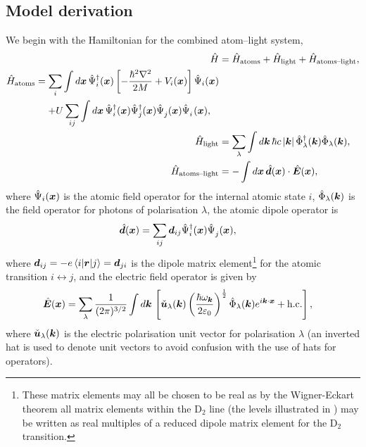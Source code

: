 \subsection{Model derivation}
\label{OpticalPumping:MultimodeModelDerivation}

We begin with the Hamiltonian for the combined atom--light system,
\begin{subequations}
    \label{OpticalPumping:AtomLightHamiltonian}
    \begin{align}
        \hat{H} &= \hat{H}_\text{atoms} + \hat{H}_\text{light} + \hat{H}_\text{atoms--light}, \\
        \begin{split}
            \hat{H}_\text{atoms} &= \sum_i \int d \vect{x}\, \hat{\Psi}_i^\dagger(\vect{x}) \left[ - \frac{\hbar^2 \nabla^2}{2 M} + V_i(\vect{x}) \right] \hat{\Psi}_i(\vect{x}) \\
            &\relphantom{=} + U \sum_{ij}\int d \vect{x}\, \hat{\Psi}_i^\dagger(\vect{x}) \hat{\Psi}_j^\dagger(\vect{x}) \hat{\Psi}_j^{\phantom{\dagger}}(\vect{x}) \hat{\Psi}_i^{\phantom{\dagger}}(\vect{x}),
        \end{split}\\
        \hat{H}_\text{light} &= \sum_\lambda \int d \vect{k}\, \hbar c \abs{\vect{k}} \hat{\Phi}_\lambda^\dagger(\vect{k}) \hat{\Phi}_\lambda(\vect{k}), \\
        \hat{H}_\text{atoms--light} &= - \int d \vect{x}\, \hat{\vect{d}}(\vect{x}) \cdot \hat{\vect{E}}(\vect{x}), \label{OpticalPumping:AtomLightCouplingHamiltonian}
    \end{align}
\end{subequations}
where $\hat{\Psi}_i(\bm{x})$ is the atomic field operator for the internal atomic state $i$, $\hat{\Phi}_\lambda(\bm{k})$ is the field operator for photons of polarisation $\lambda$, the atomic dipole operator is
\begin{align}
    \hat{\bm{d}}(\bm{x}) &= \sum_{ij}\bm{d}_{ij} \hat{\Psi}_i^\dagger(\bm{x}) \hat{\Psi}_j^{\phantom{\dagger}}(\bm{x}),
\end{align}
where $\bm{d}_{ij} = -e\left<i\middle|\bm{r}\middle|j\right> = \bm{d}_{ji}$ is the dipole matrix element\footnote{These matrix elements may all be chosen to be real as by the Wigner-Eckart theorem \citep{Eckart:1930,Brink:1962} all matrix elements within the $\text{D}_2$ line (the levels illustrated in ) may be written as real multiples of a reduced dipole matrix element for the $\text{D}_2$ transition.} for the atomic transition $i \leftrightarrow j$, and the electric field operator is given by
\begin{align}
    \hat{\bm{E}}(\bm{x}) &= \sum_\lambda \frac{1}{(2\pi)^{3/2}} \int d \bm{k}\, \left[\check{\bm{u}}_\lambda(\bm{k}) \left(\frac{\hbar \omega_{\bm{k}}}{2\varepsilon_0} \right)^{\frac{1}{2}} \hat{\Phi}_\lambda(\bm{k}) e^{i \bm{k} \cdot \bm{x}} + \text{h.c.}\right],
\end{align}
where $\check{\bm{u}}_\lambda(\bm{k})$ is the electric polarisation unit vector for polarisation $\lambda$ (an inverted hat is used to denote unit vectors to avoid confusion with the use of hats for operators).

